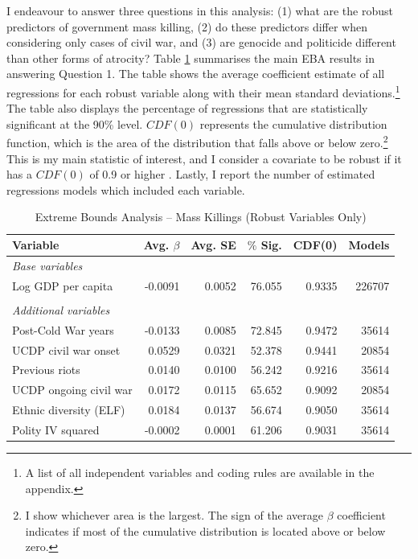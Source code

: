 \documentclass[a4paper,12pt]{article}
\begin{document}
I endeavour to answer three questions in this analysis: (1) what are the robust predictors of government mass killing, (2) do these predictors differ when considering only cases of civil war, and (3) are genocide and politicide different than other forms of atrocity? Table \ref{tab:eba01} summarises the main EBA results in answering Question 1. The table shows the average coefficient estimate of all regressions for each robust variable along with their mean standard deviations.\footnote{A list of all independent variables and coding rules are available in the appendix.} The table also displays the percentage of regressions that are statistically significant at the 90\% level. $CDF(0)$ represents the cumulative distribution function, which is the area of the distribution that falls above or below zero.\footnote{I show whichever area is the largest. The sign of the average $\beta$ coefficient indicates if most of the cumulative distribution is located above or below zero.} This is my main statistic of interest, and I consider a covariate to be robust if it has a $CDF(0)$ of 0.9 or higher \citep[181]{sala1997just}. Lastly, I report the number of estimated regressions models which included each variable.

\begin{table}[H]
\centering
\begin{tabular}{lrrrrr}
\hline
\textbf{Variable} & \textbf{Avg. $\beta$} & \textbf{Avg. SE} & \textbf{$\%$ Sig.} & \textbf{CDF(0)} & \textbf{Models} \\ \hline
\textit{Base variables} &  &  &  &  &  \\
Log GDP per capita & -0.0091 & 0.0052 & 76.055 & 0.9335 & 226707 \\
 &  &  &  &  &  \\
\textit{Additional variables} &  &  &  &  &  \\
Post-Cold War years & -0.0133 & 0.0085 & 72.845 & 0.9472 & 35614 \\
UCDP civil war onset & 0.0529 & 0.0321 & 52.378 & 0.9441 & 20854 \\
Previous riots & 0.0140 & 0.0100 & 56.242 & 0.9216 & 35614 \\
UCDP ongoing civil war & 0.0172 & 0.0115 & 65.652 & 0.9092 & 20854 \\
Ethnic diversity (ELF) & 0.0184 & 0.0137 & 56.674 & 0.9050 & 35614 \\
Polity IV squared & -0.0002 & 0.0001 & 61.206 & 0.9031 & 35614 \\ \hline
\end{tabular}
\caption{Extreme Bounds Analysis -- Mass Killings (Robust Variables Only)}
\label{tab:eba01}
\end{table}
	
\end{document}
